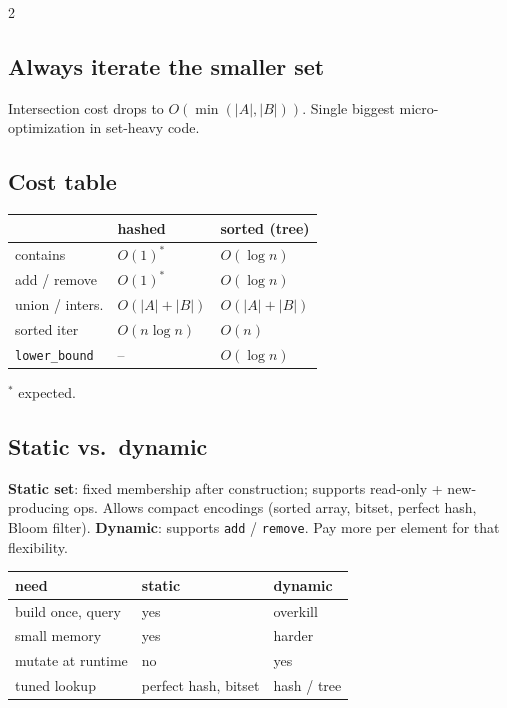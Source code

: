 \documentclass[10pt]{article}
\begin{document}
\begin{multicols}{2}
\subsection*{Always iterate the smaller set}
Intersection cost drops to $O(\min(|A|,|B|))$.
Single biggest micro-optimization in set-heavy code.

\subsection*{Cost table}
\begin{tabular}{@{}l|ll@{}}
                  & \textbf{hashed}        & \textbf{sorted (tree)}\\
\hline
contains          & $O(1)^*$               & $O(\log n)$\\
add / remove      & $O(1)^*$               & $O(\log n)$\\
union / inters.   & $O(|A| + |B|)$         & $O(|A| + |B|)$\\
sorted iter       & $O(n \log n)$          & $O(n)$\\
\texttt{lower\_bound} & --                 & $O(\log n)$
\end{tabular}
$^*$ expected.

\columnbreak

\subsection*{Static vs.\ dynamic}
\textbf{Static set}: fixed membership after construction; supports
read-only + new-producing ops. Allows compact encodings (sorted
array, bitset, perfect hash, Bloom filter).
\textbf{Dynamic}: supports \texttt{add} / \texttt{remove}. Pay more
per element for that flexibility.

\begin{tabular}{@{}l|l|l@{}}
\textbf{need}       & \textbf{static}       & \textbf{dynamic}\\
\hline
build once, query  & yes                   & overkill\\
small memory       & yes                   & harder\\
mutate at runtime  & no                    & yes\\
tuned lookup       & perfect hash, bitset  & hash / tree
\end{tabular}


\end{multicols}
\end{document}
